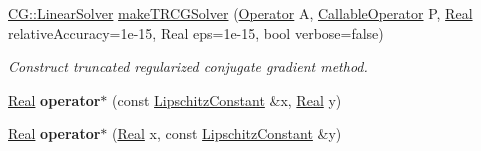 \begin{DoxyCompactItemize}
\hyperlink{classSpacy_1_1CG_1_1LinearSolver}{C\-G\-::\-Linear\-Solver} \hyperlink{namespaceSpacy_af214c1f5a7c2e48d16370a7a386ca8df}{make\-T\-R\-C\-G\-Solver} (\hyperlink{classSpacy_1_1Operator}{Operator} A, \hyperlink{namespaceSpacy_a022a87afa759e18781dd2aea9a80cd73}{Callable\-Operator} P, \hyperlink{classSpacy_1_1Real}{Real} relative\-Accuracy=1e-\/15, Real eps=1e-\/15, bool verbose=false)
\begin{DoxyCompactList}\small\item\em Construct truncated regularized conjugate gradient method. \end{DoxyCompactList}\item 
\hypertarget{namespaceSpacy_a81f372bdfa76c83a44edab9f33c2e8c8}{\hyperlink{classSpacy_1_1Real}{Real} {\bfseries operator$\ast$} (const \hyperlink{classSpacy_1_1LipschitzConstant}{Lipschitz\-Constant} \&x, \hyperlink{classSpacy_1_1Real}{Real} y)}\label{namespaceSpacy_a81f372bdfa76c83a44edab9f33c2e8c8}

\item 
\hypertarget{namespaceSpacy_af2f966e1b7480cdbd9ac1d9efc5b32f3}{\hyperlink{classSpacy_1_1Real}{Real} {\bfseries operator$\ast$} (\hyperlink{classSpacy_1_1Real}{Real} x, const \hyperlink{classSpacy_1_1LipschitzConstant}{Lipschitz\-Constant} \&y)}\label{namespaceSpacy_af2f966e1b7480cdbd9ac1d9efc5b32f3}


\end{DoxyCompactItemize}
